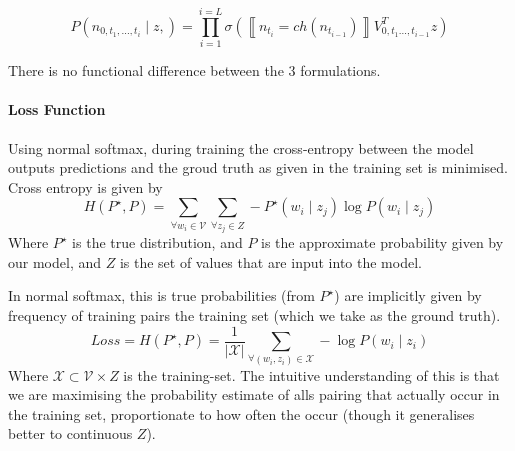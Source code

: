 \documentclass[parskip]{komatufte}
\begin{document}

\begin{equation}
P(n_{0,t_{1},...,t_{i}}\mid z,)=\prod_{i=1}^{i=L}\sigma\left(\left\llbracket n_{t_{i}}=ch(n_{t_{i-1}})\right\rrbracket V_{0,t_{1}...,t_{i-1}}^{T}z\right)
\end{equation}


There is no functional difference between the 3 formulations.

\paragraph{Loss Function}


Using normal softmax, during training the cross-entropy between the model outputs predictions and the groud truth as given in the training set is minimised.
Cross entropy is given by
\begin{equation}
H(P^\star, P) = \sum_{\forall w_i\in \mathcal{V}} \sum_{\forall z_j \in Z} -P^\star(w_i \mid z_j) \log P(w_i \mid z_j)
\end{equation}
Where $P^\star$ is the true distribution, and $P$ is the approximate probability given by our model,
and $Z$ is the set of values that are input into the model.

In normal softmax, this is true probabilities (from $P^\star$) are implicitly given by frequency of training pairs the training set (which we take as the ground truth).
\begin{equation}
Loss=H(P^\star, P) = \frac{1}{|\mathcal{X}|} \sum_{\forall (w_i, z_i) \in \mathcal{X}} -\log P(w_i \mid z_i)
\end{equation}
Where $\mathcal{X} \subset \mathcal{V} \times Z$ is the training-set.
The intuitive understanding of this is that we are maximising the probability estimate of alls pairing that actually occur in the training set, proportionate to how often the occur (though it generalises better to continuous $Z$).
\end{document}
